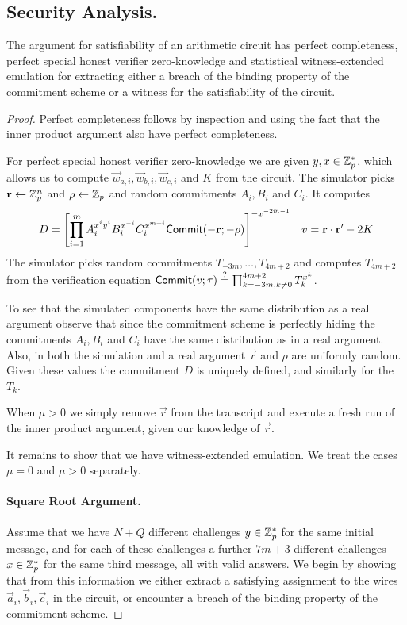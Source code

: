 \subsection{Security Analysis.}
\begin{theorem}
\label{th:mainAC}
The argument for satisfiability of an arithmetic circuit has perfect completeness, perfect special honest verifier zero-knowledge and statistical witness-extended emulation for extracting either a breach of the binding property of the commitment scheme or a witness for the satisfiability of the circuit.
\end{theorem}

\begin{proof}
Perfect completeness follows by inspection and using the fact that the inner product argument also have perfect completeness.

For perfect special honest verifier zero-knowledge we are given $y,x\in \mathbb{Z}_p^*$, which allows us to compute $\vec{w}_{a,i},\vec{w}_{b,i},\vec{w}_{c,i}$ and $K$ from the circuit. The simulator picks $\mathbf{r}\gets \mathbb{Z}_p^n$ and $\rho \gets \mathbb{Z}_p$ and random commitments $A_{i},B_i$ and $C_i$. It computes \begin{align*}D=\left[\prod_{i=1}^m A_{i}^{x^i y^i}B_{i}^{x^{-i}}C_{i}^{x^{m+i}}\mathsf{Commit}(-\mathbf{r};-\rho)\right]^{-x^{-2m-1}}&& v=\mathbf{r}\cdot \mathbf{r}'-2K\end{align*}
The simulator picks random commitments $T_{-3m},\ldots,T_{4m+2}$ and computes $T_{4m+2}$ from the verification equation $\mathsf{Commit}(v;\tau) \overset{?}{=} \prod_{k=-3m, k\neq 0}^{4m+2} T_k^{x^k}$.

To see that the simulated components have the same distribution as a real argument observe that since the commitment scheme is perfectly hiding the commitments $A_{i},B_i$ and $C_i$ have the same distribution as in a real argument. Also, in both the simulation and a real argument $\vec{r}$ and $\rho$ are uniformly random. Given these values the commitment $D$ is uniquely defined, and similarly for the $T_k$.

When $\mu>0$ we simply remove $\vec{r}$ from the transcript and execute a fresh run of the inner product argument, given our knowledge of $\vec{r}$.

It remains to show that we have witness-extended emulation. We treat the cases $\mu=0$ and $\mu >0$ separately.

\paragraph{Square Root Argument.} Assume that we have $N+Q$ different challenges $y\in \mathbb{Z}_p^*$ for the same initial message, and for each of these challenges a further $7m+3$ different challenges $x\in \mathbb{Z}_p^*$ for the same third message, all with valid answers. We begin by showing that from this information we either extract a satisfying assignment to the wires $\vec{a}_{i},\vec{b}_i,\vec{c}_i$ in the circuit, or encounter a breach of the binding property of the commitment scheme.


\end{proof}
